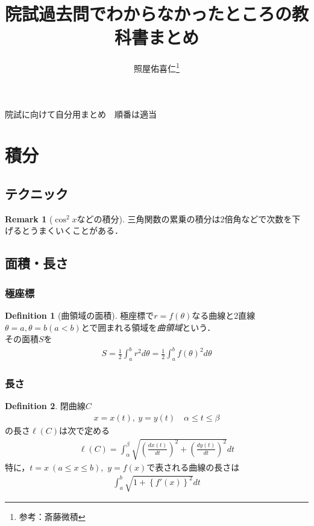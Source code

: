 \documentclass[a4j,uplatex]{jsarticle}
\title{院試過去問でわからなかったところの教科書まとめ}
\author{照屋佑喜仁\thanks{参考：斎藤微積}}
\theoremstyle{definition}
\newtheorem*{df*}{Definition}
\newtheorem{rem}[dfn]{Remark}
\begin{document}
\maketitle
院試に向けて自分用まとめ　順番は適当
\tableofcontents

\section{積分}
\subsection{テクニック}
\begin{rem}[$\cos^2x$などの積分]
    三角関数の累乗の積分は2倍角などで次数を下げるとうまくいくことがある．
\end{rem}
\subsection{面積・長さ}
\subsubsection{極座標}
\begin{df*}[曲領域の面積]
    極座標で$r=f(\theta)$なる曲線と2直線$\theta=a,\theta=b(a<b)$とで囲まれる領域を\emph{曲領域}という．\\
    その面積$S$を
    \begin{align*}
        S=\frac{1}{2}\int_{a}^{b}r^2d\theta=\frac{1}{2}\int_{a}^{b}f(\theta)^2d\theta
    \end{align*}
\end{df*}

\subsubsection{長さ}
\begin{df*}
    閉曲線$C$
    \begin{align*}
        x=x(t),\: y=y(t) \quad \alpha \leq t \leq \beta
    \end{align*}
    の長さ$\ell(C)$は次で定める
    \begin{align*}
        \ell(C)=\int_{\alpha}^{\beta}\sqrt{\left(\frac{dx(t)}{dt}\right)^2+\left(\frac{dy(t)}{dt}\right)^2}dt
    \end{align*}
    特に，$t=x\: (a\leq x\leq b)$,\ $y=f(x)$で表される曲線の長さは
    \begin{align*}
        \int_{a}^{b}\sqrt{1+\left\{f'(x)\right\}^2}dt
    \end{align*}
\end{df*}
\end{document}
